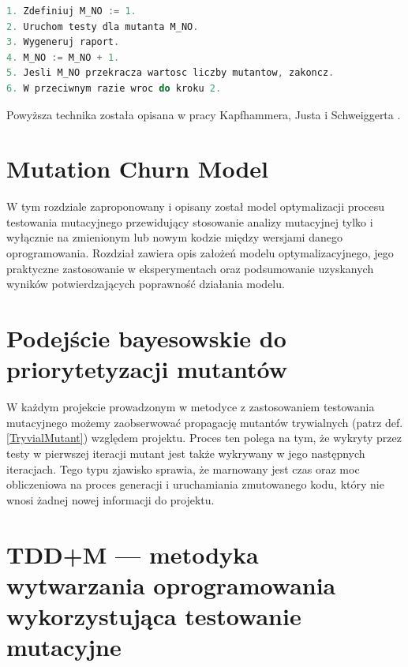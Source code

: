 \documentclass[11pt,a4paper,oldfontcommands]{memoir}
\theoremstyle{plain}
\theoremstyle{definition}
\theoremstyle{remark}
\begin{document}
\begin{lstlisting}[language=C++, caption={Proces testowania mutacyjnego z wieloma mutacjami w kompilacji}]
1. Zdefiniuj M_NO := 1. 
2. Uruchom testy dla mutanta M_NO. 
3. Wygeneruj raport. 
4. M_NO := M_NO + 1. 
5. Jesli M_NO przekracza wartosc liczby mutantow, zakoncz.
6. W przeciwnym razie wroc do kroku 2.
\end{lstlisting}

Powyższa technika została opisana w pracy Kapfhammera, Justa i  Schweiggerta \cite{JustKS2011}.







\chapter{Mutation Churn Model \label{section:MutationChurnMode}}

W tym rozdziale zaproponowany i opisany został model optymalizacji procesu testowania mutacyjnego przewidujący stosowanie analizy mutacyjnej tylko i wyłącznie na zmienionym lub nowym kodzie między wersjami danego oprogramowania. Rozdział zawiera opis założeń modelu optymalizacyjnego, jego praktyczne zastosowanie w eksperymentach oraz podsumowanie uzyskanych wyników potwierdzających poprawność działania modelu. 


\chapter{Podejście bayesowskie do priorytetyzacji mutantów \label{section:bayes}}
W każdym projekcie prowadzonym w metodyce z zastosowaniem testowania mutacyjnego możemy zaobserwować propagację mutantów trywialnych (patrz def. \ref{TryvialMutant}) względem projektu. Proces ten polega na tym, że wykryty przez testy w pierwszej iteracji mutant jest także wykrywany w jego następnych iteracjach. Tego typu zjawisko sprawia, że marnowany jest czas oraz moc obliczeniowa na proces generacji i uruchamiania zmutowanego kodu, który nie wnosi żadnej nowej informacji do projektu.

\chapter{TDD+M — metodyka wytwarzania oprogramowania wykorzystująca testowanie mutacyjne \label{TDDM:chapter}}
\end{document}
